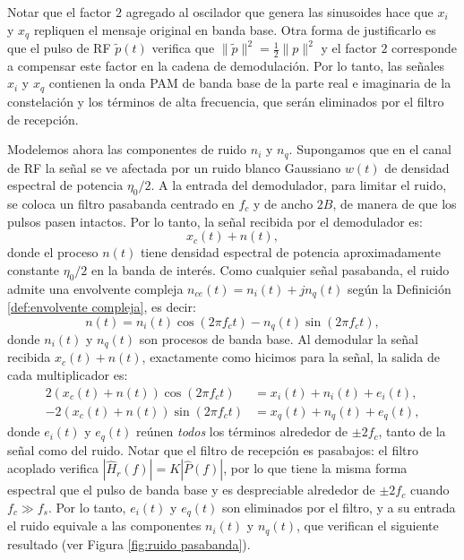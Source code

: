 Notar que el factor $2$ agregado al oscilador que genera las sinusoides hace que $x_i$ y $x_q$ repliquen el mensaje original en banda base. Otra forma de justificarlo es que el pulso de RF $\tilde{p}(t)$ verifica que $\|\tilde{p}\|^2 = \frac{1}{2}\|p\|^2$ y el factor $2$ corresponde a compensar este factor en la cadena de demodulación. Por lo tanto, las señales $x_i$ y $x_q$ contienen la onda PAM de banda base de la parte real e imaginaria de la constelación y los términos de alta frecuencia, que serán eliminados por el filtro de recepción. 

Modelemos ahora las componentes de ruido $n_i$ y $n_q$. Supongamos que en el canal de RF la señal se ve afectada por un ruido blanco Gaussiano $w(t)$ de densidad espectral de potencia $\eta_0/2$. A la entrada del demodulador, para limitar el ruido, se coloca un filtro pasabanda centrado en $f_c$ y de ancho $2B$, de manera de que los pulsos pasen intactos. Por lo tanto, la señal recibida por el demodulador es:
\begin{equation*}
    x_c(t) + n(t),
\end{equation*}
donde el proceso $n(t)$ tiene densidad espectral de potencia aproximadamente constante $\eta_0/2$ en la banda de interés. Como cualquier señal pasabanda, el ruido admite una envolvente compleja $n_{ce}(t)=n_i(t)+jn_q(t)$ según la Definición \ref{def:envolvente compleja}, es decir:
\begin{equation*}
    n(t) = n_i(t)\cos(2\pi f_c t) - n_q(t)\sin(2\pi f_c t),
\end{equation*}
donde $n_i(t)$ y $n_q(t)$ son procesos de banda base. Al demodular la señal recibida $x_c(t)+n(t)$, exactamente como hicimos para la señal, la salida de cada multiplicador es:
\begin{align*}
    2\left(x_c(t)+n(t)\right)\cos(2\pi f_c t) &= x_i(t) + n_i(t) + e_i(t), \\
    -2\left(x_c(t)+n(t)\right)\sin(2\pi f_c t) &= x_q(t) + n_q(t) + e_q(t),
\end{align*}
donde $e_i(t)$ y $e_q(t)$ reúnen \emph{todos} los términos alrededor de $\pm 2f_c$, tanto de la señal como del ruido. Notar que el filtro de recepción es pasabajos: el filtro acoplado verifica $|\hat{H}_r(f)| = K|\hat{P}(f)|$, por lo que tiene la misma forma espectral que el pulso de banda base y es despreciable alrededor de $\pm 2f_c$ cuando $f_c\gg f_s$. Por lo tanto, $e_i(t)$ y $e_q(t)$ son eliminados por el filtro, y a su entrada el ruido equivale a las componentes $n_i(t)$ y $n_q(t)$, que verifican el siguiente resultado (ver Figura \ref{fig:ruido pasabanda}).


